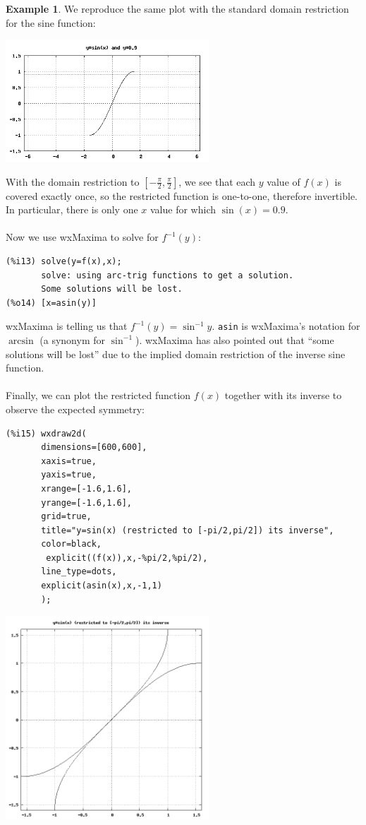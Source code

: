 \documentclass[10.5pt,twoside]{report}
\theoremstyle{definition}
\newtheorem{exmp}{Example}[section]
\begin{document}
\begin{exmp}
We reproduce the same plot with the standard domain restriction for the sine function:

\includegraphics[width=3in]{example_2_4_2_2}

With the domain restriction to $[-\frac{\pi}{2},\frac{\pi}{2}]$, we see that each $y$ value of $f(x)$ is covered exactly once, so the restricted function is one-to-one, therefore invertible.  In particular, there is only one $x$ value for which $\sin(x)=0.9$. \\
${}$\\
Now we use wxMaxima to solve for $f^{-1}(y)$:

\begin{verbatim}
(%i13) solve(y=f(x),x);
       solve: using arc-trig functions to get a solution.
       Some solutions will be lost.
(%o14) [x=asin(y)]
\end{verbatim} 

wxMaxima is telling us that $f^{-1}(y)=\sin^{-1}{y}$.  \verb|asin| is wxMaxima's notation for $\arcsin$ (a synonym for $\sin^{-1}$).  wxMaxima has also pointed out that ``some solutions will be lost'' due to the implied domain restriction of the inverse sine function.\\
${}$\\
Finally, we can plot the restricted function $f(x)$ together with its inverse to observe the expected symmetry:

\begin{verbatim}
(%i15) wxdraw2d(
       dimensions=[600,600],
       xaxis=true,
       yaxis=true,
       xrange=[-1.6,1.6],
       yrange=[-1.6,1.6],
       grid=true,
       title="y=sin(x) (restricted to [-pi/2,pi/2]) its inverse",
       color=black,
        explicit((f(x)),x,-%pi/2,%pi/2),
       line_type=dots,
       explicit(asin(x),x,-1,1)
       );
\end{verbatim}

\includegraphics[width=3in]{example_2_4_2_3}


\end{exmp}
\end{document}
